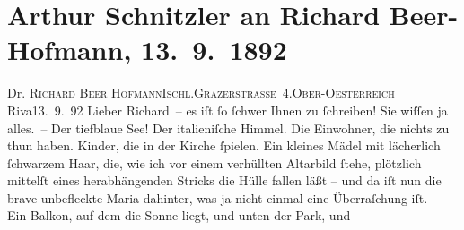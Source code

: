 

         
         \renewcommand{\erwaehntePersonen}{Personen: Richard Beer-Hofmann}
         \renewcommand{\erwaehnteOrte}{Orte: Bad Ischl, Grazer Straße, Italien, Lago di Garda, Riva del Garda}
         \renewcommand{\erwaehnteWerke}{}
               \section[Arthur Schnitzler an Richard Beer-Hofmann, 13. 9. 1892]{ Arthur Schnitzler an Richard Beer-Hofmann, 13. 9. 1892}\nopagebreak{}\rehead{ }\begin{ledgroupsized}[t]{13cm}\normalsize\beginnumbering \toendnotes[C]{\smallbreak\pagebreak[2]} 
\toendnotes[C]{\smallbreak}\pstart{}{\pb}Dr. \textsc{Richard Beer Hofmann}\pend{}\pstart{}\textsc{Ischl.}\pend{}\pstart{}\textsc{Grazerstraße 4}.\pend{}\pstart{}\textsc{Ober-Oesterreich}\pend{}{\bigskip}\pstart
           \raggedleft{}{\pb}Riva13. 9. 92\pend
           \pstart
           Lieber Richard – es iſt ſo ſchwer Ihnen zu ſchreiben! Sie wiſſen ja
               alles. – Der tiefblaue See! Der italieniſche
               Himmel. Die Einwohner, die nichts zu thun haben. Kinder, die in der Kirche ſpielen.
               Ein kleines Mädel mit lächerlich ſchwarzem Haar, die, wie ich vor einem verhüllten
               Altarbild ſtehe, plötzlich mittelſt eines herabhängenden Stricks die Hülle fallen
               läßt – und da iſt nun die brave unbefleckte Maria dahinter, was ja nicht einmal eine
               Überraſchung iſt. – Ein Balkon, auf dem die Sonne liegt, und unten der Park, und

\end{ledgroupsized}
